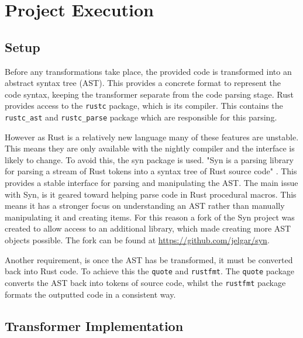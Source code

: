 \documentclass[ oneside,%
                    author={James Elgar},
                    degree={MEng},
                     title={Bidirectional transformer between functional and \\ object-oriented programming in Rust},
                  subtitle={}]{dissertation}
\begin{document}


\chapter{Project Execution}
\label{chap:execution}

\section{Setup}

Before any transformations take place, the provided code is transformed into an abstract syntax tree (AST). This provides a concrete format to represent the code syntax, keeping the transformer separate from the code parsing stage. Rust provides access to the \verb|rustc| package, which is its compiler. This contains the \verb|rustc_ast| and \verb|rustc_parse| package which are responsible for this parsing.

However as Rust is a relatively new language many of these features are unstable. This means they are only available with the nightly compiler and the interface is likely to change. To avoid this, the syn package is used. "Syn is a parsing library for parsing a stream of Rust tokens into a syntax tree of Rust source code" \cite{syn}. This provides a stable interface for parsing and manipulating the AST.
The main issue with Syn, is it geared toward helping parse code in Rust procedural macros. This means it has a stronger focus on understanding an AST rather than manually manipulating it and creating items. For this reason a fork of the Syn project was created to allow access to an additional library, which made creating more AST objects possible. The fork can be found at \url{https://github.com/jelgar/syn}.

Another requirement, is once the AST has be transformed, it must be converted back into Rust code. To achieve this the \verb|quote| and \verb|rustfmt|. The \verb|quote|  package converts the AST back into tokens of source code, whilst the \verb|rustfmt| package formats the outputted code in a consistent way.

\section{Transformer Implementation}
\end{document}
